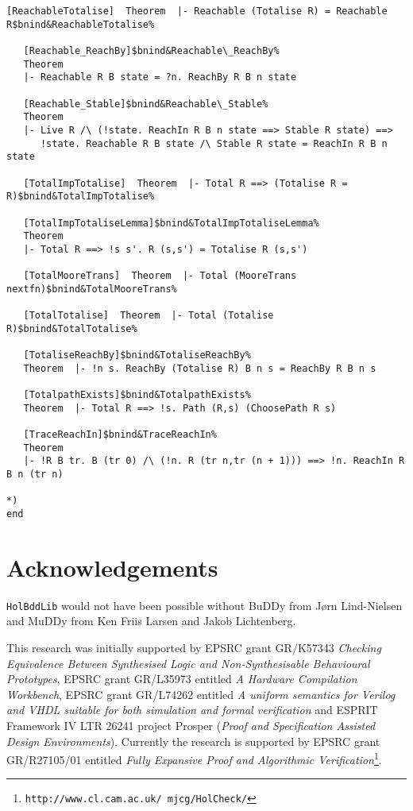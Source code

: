 \documentclass[12pt]{article}
\renewcommand{\t}[1]{\mbox{\tt #1}}
\newcommand{\Buddy}{BuDDy\xspace}
\newcommand{\Muddy}{MuDDy\xspace}
\begin{document}
\begin{footnotesize}
\begin{Verbatim}[commandchars=\$\&\%]
   [ReachableTotalise]  Theorem  |- Reachable (Totalise R) = Reachable R$bnind&ReachableTotalise%
   
   [Reachable_ReachBy]$bnind&Reachable\_ReachBy%
   Theorem
   |- Reachable R B state = ?n. ReachBy R B n state
   
   [Reachable_Stable]$bnind&Reachable\_Stable%
   Theorem
   |- Live R /\ (!state. ReachIn R B n state ==> Stable R state) ==>
      !state. Reachable R B state /\ Stable R state = ReachIn R B n state
   
   [TotalImpTotalise]  Theorem  |- Total R ==> (Totalise R = R)$bnind&TotalImpTotalise%
   
   [TotalImpTotaliseLemma]$bnind&TotalImpTotaliseLemma%
   Theorem
   |- Total R ==> !s s'. R (s,s') = Totalise R (s,s')
   
   [TotalMooreTrans]  Theorem  |- Total (MooreTrans nextfn)$bnind&TotalMooreTrans%
   
   [TotalTotalise]  Theorem  |- Total (Totalise R)$bnind&TotalTotalise%
   
   [TotaliseReachBy]$bnind&TotaliseReachBy%
   Theorem  |- !n s. ReachBy (Totalise R) B n s = ReachBy R B n s
   
   [TotalpathExists]$bnind&TotalpathExists%
   Theorem  |- Total R ==> !s. Path (R,s) (ChoosePath R s)
   
   [TraceReachIn]$bnind&TraceReachIn%
   Theorem
   |- !R B tr. B (tr 0) /\ (!n. R (tr n,tr (n + 1))) ==> !n. ReachIn R B n (tr n)

*)
end
\end{Verbatim}
\end{footnotesize}

\section*{Acknowledgements}

\t{HolBddLib} would not have been possible without \Buddy from
J{\o}rn Lind-Nielsen and \Muddy from Ken Friis Larsen and Jakob Lichtenberg.

This research was initially supported by EPSRC grant
GR/K57343 {\em Checking Equivalence Between Synthesised Logic and
Non-Synthesisable Behavioural Prototypes}, EPSRC grant GR/L35973
entitled {\it A Hardware Compilation Workbench\/}, EPSRC grant
GR/L74262 entitled {\it A uniform semantics for Verilog and VHDL
suitable for both simulation and formal verification\/} and ESPRIT
Framework IV LTR 26241 project Prosper ({\em Proof and Specification
Assisted Design Environments}). Currently the research is supported by
EPSRC grant GR/R27105/01 entitled {\it Fully Expansive Proof and
Algorithmic Verification\/}\footnote{\texttt{http://www.cl.cam.ac.uk/~mjcg/HolCheck/}}.
\end{document}
